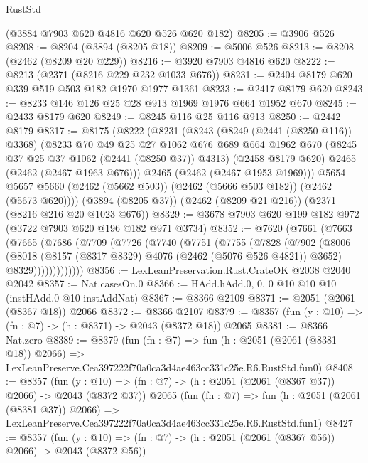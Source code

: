 \begin{lexlean}{RustStd}
\begin{coremodule}
    (@3884 @7903 @620 @4816 @620 @526 @620 @182)
@8205 := @3906 @526
@8208 := @8204 (@3894 (@8205 @18))
@8209 := @5006 @526
@8213 := @8208 (@2462 (@8209 @20 @229))
@8216 := @3920 @7903 @4816 @620
@8222 := @8213 (@2371 (@8216 @229 @232 @1033 @676))
@8231 := @2404 @8179 @620 @339 @519 @503 @182 @1970 @1977 @1361
@8233 := @2417 @8179 @620
@8243 := @8233 @146 @126 @25 @28 @913 @1969 @1976 @664 @1952 @670
@8245 := @2433 @8179 @620
@8249 := @8245 @116 @25 @116 @913
@8250 := @2442 @8179
@8317 := @8175
    (@8222
      (@8231
        (@8243
          (@8249 (@2441 (@8250 @116)) @3368)
          (@8233
            @70
            @49
            @25
            @27
            @1062
            @676
            @689
            @664
            @1962
            @670
            (@8245 @37 @25 @37 @1062 (@2441 (@8250 @37)) @4313)
            (@2458 @8179 @620)
            @2465
            (@2462 (@2467 @1963 @676)))
          @2465
          (@2462 (@2467 @1953 @1969)))
        @5654
        @5657
        @5660
        (@2462 (@5662 @503))
        (@2462 (@5666 @503 @182))
        (@2462 (@5673 @620))))
    (@3894 (@8205 @37))
    (@2462 (@8209 @21 @216))
    (@2371 (@8216 @216 @20 @1023 @676))
@8329 := @3678 @7903 @620 @199 @182 @972 (@3722 @7903 @620 @196 @182 @971 @3734)
@8352 := @7620
    (@7661
      (@7663
        (@7665
          (@7686
            (@7709
              (@7726
                (@7740
                  (@7751
                    (@7755
                      (@7828
                        (@7902
                          (@8006
                            (@8018
                              (@8157 (@8317 @8329) @4076 (@2462 (@5076 @526 @4821)) @3652)
                              @8329)))))))))))))
@8356 := LexLeanPreservation.Rust.CrateOK @2038 @2040 @2042
@8357 := Nat.casesOn.{0}
@8366 := HAdd.hAdd.{0, 0, 0} @10 @10 @10 (instHAdd.{0} @10 instAddNat)
@8367 := @8366 @2109
@8371 := @2051 (@2061 (@8367 @18)) @2066
@8372 := @8366 @2107
@8379 := @8357 (fun (y : @10) => (fn : @7) -> (h : @8371) -> @2043 (@8372 @18)) @2065
@8381 := @8366 Nat.zero
@8389 := @8379
    (fun (fn : @7) =>
    fun (h : @2051 (@2061 (@8381 @18)) @2066) =>
    LexLeanPreserve.Cea397222f70a0ca3d4ae463cc331c25e.R6.RustStd.fun0)
@8408 := @8357
    (fun (y : @10) => (fn : @7) -> (h : @2051 (@2061 (@8367 @37)) @2066) -> @2043 (@8372 @37))
    @2065
    (fun (fn : @7) =>
    fun (h : @2051 (@2061 (@8381 @37)) @2066) =>
    LexLeanPreserve.Cea397222f70a0ca3d4ae463cc331c25e.R6.RustStd.fun1)
@8427 := @8357
    (fun (y : @10) => (fn : @7) -> (h : @2051 (@2061 (@8367 @56)) @2066) -> @2043 (@8372 @56))

\end{coremodule}
\end{lexlean}
